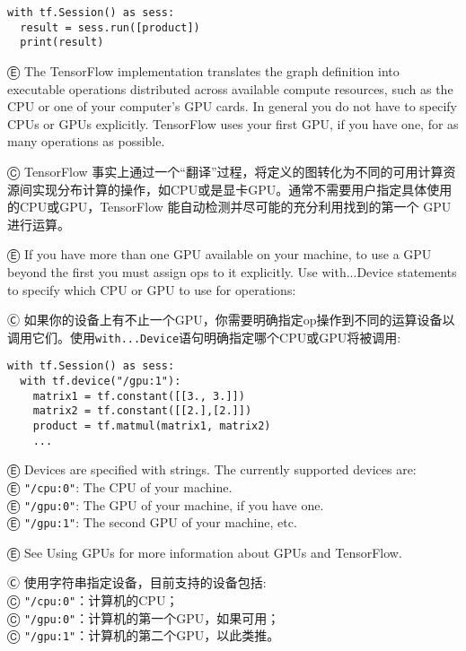 \begin{lstlisting}
with tf.Session() as sess:
  result = sess.run([product])
  print(result)
\end{lstlisting}

Ⓔ \textcolor{etc}{The TensorFlow implementation translates the graph definition into executable operations distributed across available compute resources, such as the CPU or one of your computer's GPU cards. In general you do not have to specify CPUs or GPUs explicitly. TensorFlow uses your first GPU, if you have one, for as many operations as possible.}

Ⓒ TensorFlow 事实上通过一个“翻译”过程，将定义的图转化为不同的可用计算资源间实现分布计算的操作，如CPU或是显卡GPU。通常不需要用户指定具体使用的CPU或GPU，TensorFlow 能自动检测并尽可能的充分利用找到的第一个 GPU 进行运算。

Ⓔ \textcolor{etc}{If you have more than one GPU available on your machine, to use a GPU beyond the first you must assign ops to it explicitly. Use with...Device statements to specify which CPU or GPU to use for operations:}

Ⓒ 如果你的设备上有不止一个GPU，你需要明确指定op操作到不同的运算设备以调用它们。使用\lstinline{with...Device}语句明确指定哪个CPU或GPU将被调用:

\begin{lstlisting}
with tf.Session() as sess:
  with tf.device("/gpu:1"):
    matrix1 = tf.constant([[3., 3.]])
    matrix2 = tf.constant([[2.],[2.]])
    product = tf.matmul(matrix1, matrix2)
    ...
\end{lstlisting}

Ⓔ \textcolor{etc}{Devices are specified with strings. The currently supported devices are:}\\
Ⓔ \textcolor{etc}{\lstinline{"/cpu:0"}: The CPU of your machine.}\\
Ⓔ \textcolor{etc}{\lstinline{"/gpu:0"}: The GPU of your machine, if you have one.}\\
Ⓔ \textcolor{etc}{\lstinline{"/gpu:1"}: The second GPU of your machine, etc.}

Ⓔ \textcolor{etc}{See Using GPUs for more information about GPUs and TensorFlow.}

Ⓒ 使用字符串指定设备，目前支持的设备包括:\\
Ⓒ \lstinline{"/cpu:0"}：计算机的CPU；\\
Ⓒ \lstinline{"/gpu:0"}：计算机的第一个GPU，如果可用；\\
Ⓒ \lstinline{"/gpu:1"}：计算机的第二个GPU，以此类推。

